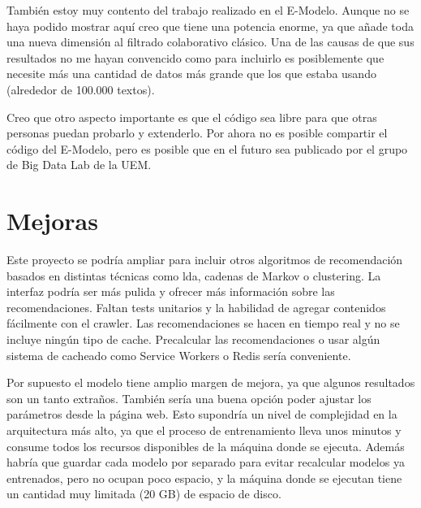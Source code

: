 \documentclass[withindex, glossary]{cam-thesis}
\begin{document}
También estoy muy contento del trabajo realizado en el E-Modelo. Aunque no se haya podido mostrar aquí creo que tiene una potencia enorme, ya que añade toda una nueva dimensión al filtrado colaborativo clásico. Una de las causas de que sus resultados no me hayan convencido como para incluirlo es posiblemente que necesite más una cantidad de datos más grande que los que estaba usando (alrededor de 100.000 textos).

Creo que otro aspecto importante es que el código sea libre para que otras personas puedan probarlo y extenderlo. Por ahora no es posible compartir el código del E-Modelo, pero es posible que en el futuro sea publicado por el grupo de Big Data Lab de la UEM\@.

\section{Mejoras}
Este proyecto se podría ampliar para incluir otros algoritmos de recomendación basados en distintas técnicas como \acrshort{lda}, cadenas de Markov o clustering. La interfaz podría ser más pulida y ofrecer más información sobre las recomendaciones. Faltan tests unitarios y la habilidad de agregar contenidos fácilmente con el crawler. Las recomendaciones se hacen en tiempo real y no se incluye ningún tipo de cache. Precalcular las recomendaciones o usar algún sistema de cacheado como Service Workers o Redis sería conveniente.

Por supuesto el modelo tiene amplio margen de mejora, ya que algunos resultados son un tanto extraños. También sería una buena opción poder ajustar los parámetros desde la página web. Esto supondría un nivel de complejidad en la arquitectura más alto, ya que el proceso de entrenamiento lleva unos minutos y consume todos los recursos disponibles de la máquina donde se ejecuta. Además habría que guardar cada modelo por separado para evitar recalcular modelos ya entrenados, pero no ocupan poco espacio, y la máquina donde se ejecutan tiene un cantidad muy limitada (20 GB) de espacio de disco.

\nocite{*}
\printbibliography{}

\listoffigures
\listoftables

\printthesisindex{}
\end{document}
